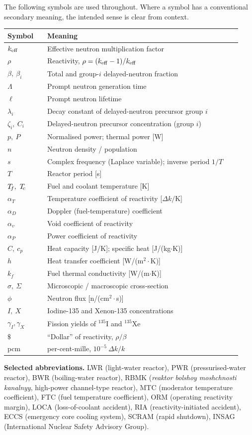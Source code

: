 The following symbols are used throughout. Where a symbol has a conventional
secondary meaning, the intended sense is clear from context.

\begin{longtable}{p{0.16\linewidth} p{0.78\linewidth}}
\toprule
\textbf{Symbol} & \textbf{Meaning} \\
\midrule
\endhead
$k_{\mathrm{eff}}$ & Effective neutron multiplication factor \\
$\rho$ & Reactivity, $\rho = (k_{\mathrm{eff}}-1)/k_{\mathrm{eff}}$ \\
$\beta,\ \beta_i$ & Total and group-$i$ delayed-neutron fraction \\
$\Lambda$ & Prompt neutron generation time \\
$\ell$ & Prompt neutron lifetime \\
$\lambda_i$ & Decay constant of delayed-neutron precursor group $i$ \\
$\zeta_i,\ C_i$ & Delayed-neutron precursor concentration (group $i$) \\
$p,\ P$ & Normalised power; thermal power [W] \\
$n$ & Neutron density / population \\
$s$ & Complex frequency (Laplace variable); inverse period $1/T$ \\
$T$ & Reactor period [s] \\
$\Tf,\ \Tc$ & Fuel and coolant temperature [K] \\
$\alpha_T$ & Temperature coefficient of reactivity [$\Delta k/\mathrm{K}$] \\
$\alpha_D$ & Doppler (fuel-temperature) coefficient \\
$\alpha_v$ & Void coefficient of reactivity \\
$\alpha_P$ & Power coefficient of reactivity \\
$C,\ c_p$ & Heat capacity [J/K]; specific heat [J/(kg$\cdot$K)] \\
$h$ & Heat transfer coefficient [W/(m$^2\cdot$K)] \\
$k_f$ & Fuel thermal conductivity [W/(m$\cdot$K)] \\
$\sigma,\ \Sigma$ & Microscopic / macroscopic cross-section \\
$\phi$ & Neutron flux [n/(cm$^2\cdot$s)] \\
$I,\ X$ & Iodine-135 and Xenon-135 concentrations \\
$\gamma_I,\gamma_X$ & Fission yields of $^{135}$I and $^{135}$Xe \\
$\$$ & ``Dollar'' of reactivity, $\rho/\beta$ \\
pcm & per-cent-mille, $10^{-5}\ \Delta k/k$ \\
\bottomrule
\end{longtable}

\noindent\textbf{Selected abbreviations.}
LWR (light-water reactor), PWR (pressurised-water reactor), BWR (boiling-water
reactor), RBMK (\emph{reaktor bolshoy moshchnosti kanalnyy}, high-power
channel-type reactor), MTC (moderator temperature coefficient), FTC (fuel
temperature coefficient), ORM (operating reactivity margin), LOCA
(loss-of-coolant accident), RIA (reactivity-initiated accident), ECCS (emergency
core cooling system), SCRAM (rapid shutdown), INSAG (International Nuclear Safety
Advisory Group).
